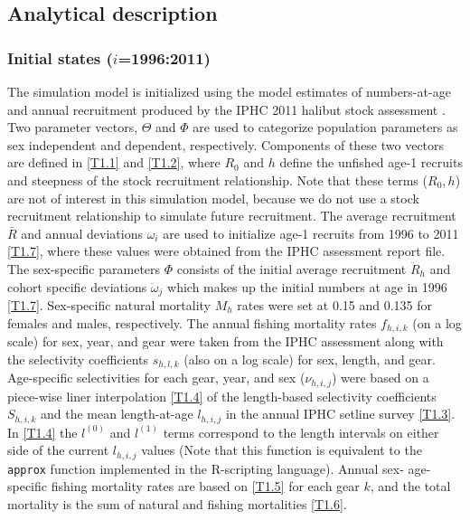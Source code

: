 \subsection{Analytical description} %
\label{sub:analytical_description}

\subsubsection{Initial states ($i$=1996:2011)} %
\label{ssub:initial_states}
The simulation model is initialized using the model estimates of numbers-at-age and annual recruitment produced by the IPHC 2011 halibut stock assessment \citep{Hare2012Rara}.  Two parameter vectors, $\Theta$ and $\Phi$ are used to categorize population parameters as sex independent and dependent, respectively.  Components of these two vectors are defined in \eqref{T1.1} and \eqref{T1.2}, where $R_0$ and $h$ define the unfished age-1 recruits and steepness of the stock recruitment relationship.  Note that these terms ($R_0,h$) are not of interest in this simulation model, because we do not use a stock recruitment relationship to simulate future recruitment.  The average recruitment $\bar{R}$ and annual deviations $\omega_i$ are used to initialize age-1 recruits from 1996 to 2011 \eqref{T1.7}, where these values were obtained from the IPHC assessment report file.  The sex-specific parameters $\Phi$ consists of the initial average recruitment $\ddot{R}_{h}$ and cohort specific deviations $\ddot{\omega}_{j}$ which makes up the initial numbers at age in 1996 \eqref{T1.7}.  Sex-specific natural mortality $M_h$ rates were set at 0.15 and 0.135 for females and males, respectively.  The annual fishing mortality rates $f_{h,i,k}$ (on a log scale) for sex, year, and gear were taken from the IPHC assessment along with the selectivity coefficients $s_{h,l,k}$ (also on a log scale) for sex, length, and gear.  Age-specific selectivities for each gear, year, and sex ($\nu_{h,i,j}$) were based on a piece-wise liner interpolation \eqref{T1.4} of the length-based selectivity coefficients $S_{h,i,k}$ and the mean length-at-age $l_{h,i,j}$ in the annual IPHC setline survey \eqref{T1.3}.  In \eqref{T1.4} the $l^{(0)}$ and $l^{(1)}$ terms correspond to the length intervals on either side of the current $l_{h,i,j}$ values (Note that this function is equivalent to the \texttt{approx} function implemented in the R-scripting  \citep{R-Development-Core-Team:2009fk} language).  Annual sex- age-specific fishing mortality rates are based on \eqref{T1.5} for each gear $k$, and the total mortality is the sum of natural and fishing mortalities \eqref{T1.6}.

